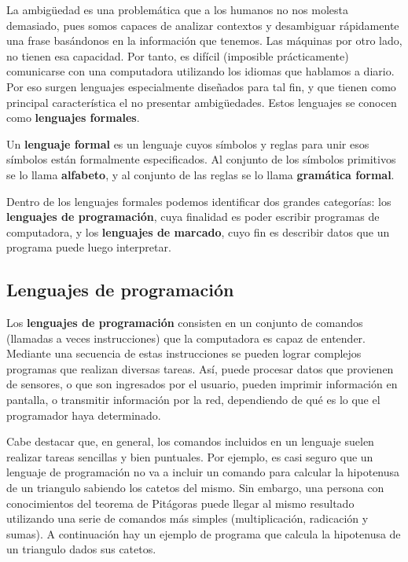 La ambigüedad es una problemática que a los humanos no nos molesta demasiado,
pues somos capaces de analizar contextos y desambiguar rápidamente una frase
basándonos en la información que tenemos. Las máquinas por otro lado, no tienen
esa capacidad. Por tanto, es difícil (imposible prácticamente) comunicarse con
una computadora utilizando los idiomas que hablamos a diario. Por eso surgen
lenguajes especialmente diseñados para tal fin, y que tienen como principal
característica el no presentar ambigüedades. Estos lenguajes se conocen como
\textbf{lenguajes formales}.

\begin{definition} Un \textbf{lenguaje formal} es un
    lenguaje cuyos símbolos y reglas para unir esos símbolos están formalmente
    especificados. Al conjunto de los símbolos primitivos se lo llama
    \textbf{alfabeto}, y al conjunto de las reglas se lo llama \textbf{gramática
    formal}.\autocite{sunitha_2015}
\end{definition}

Dentro de los lenguajes formales podemos identificar dos grandes categorías: los
\textbf{lenguajes de programación}, cuya finalidad es poder escribir programas
de computadora, y los \textbf{lenguajes de marcado}, cuyo fin es describir datos
que un programa puede luego interpretar.

\subsection{Lenguajes de programación}
\label{chap:informatica:subsec:lenguajes_programacion}

Los \textbf{lenguajes de programación} consisten en un conjunto de comandos
(llamadas a veces instrucciones) que la computadora es capaz de entender.
Mediante una secuencia de estas instrucciones se pueden lograr complejos
programas que realizan diversas tareas. Así, puede procesar datos que provienen
de sensores, o que son ingresados por el usuario, pueden imprimir información en
pantalla, o transmitir información por la red, dependiendo de qué es lo que el
programador haya determinado.

Cabe destacar que, en general, los comandos incluidos en un lenguaje suelen
realizar tareas sencillas y bien puntuales. Por ejemplo, es casi seguro que un
lenguaje de programación no va a incluir un comando para calcular la hipotenusa
de un triangulo sabiendo los catetos del mismo. Sin embargo, una persona con
conocimientos del teorema de Pitágoras puede llegar al mismo resultado
utilizando una serie de comandos más simples (multiplicación, radicación y
sumas). A continuación hay un ejemplo de programa que calcula la hipotenusa de
un triangulo dados sus catetos.


